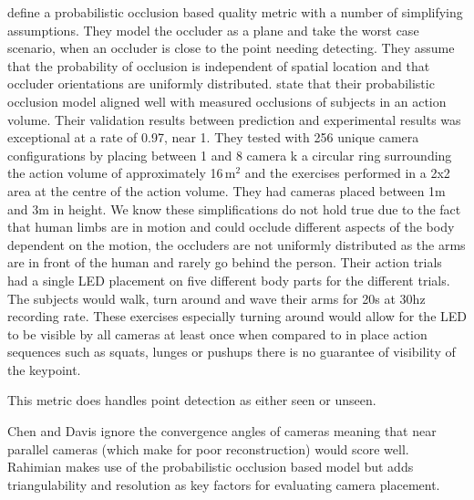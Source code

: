 \citet{chen2008occlusion} define a probabilistic occlusion based quality metric with a number of simplifying assumptions.  
They model the occluder as a plane and take the worst case scenario, when an occluder is close to the point needing detecting. They assume that the probability of occlusion is independent of spatial location and that occluder orientations are uniformly distributed.
\citet{chen2008occlusion} state that their probabilistic occlusion model aligned well with measured occlusions of subjects in an action volume. Their validation results between prediction and experimental results was exceptional at a rate of 0.97, near 1. They tested with 256 unique camera configurations by placing between 1 and 8 camera k a circular ring surrounding the action volume of approximately 16\,m$^2$ and the exercises performed in a 2x2 area at the centre of the action volume. They had cameras placed between 1m and 3m in height.
We know these simplifications do not hold true due to the fact that human limbs are in motion and could occlude different aspects of the body dependent on the motion, the occluders are not uniformly distributed as the arms are in front of the human and rarely go behind the person.
Their action trials had a single LED placement on five different body parts for the different trials. The subjects would walk, turn around and wave their arms for 20s at 30hz recording rate. These exercises especially turning around would allow for the LED to be visible by all cameras at least once when compared to in place action sequences such as squats, lunges or pushups there is no guarantee of visibility of the keypoint.

This metric does handles point detection as either seen or unseen.

Chen and Davis ignore the convergence angles of cameras meaning that near parallel cameras (which make for poor reconstruction) would score well. Rahimian makes use of the probabilistic occlusion based model but adds triangulability and resolution as key factors for evaluating camera placement.

